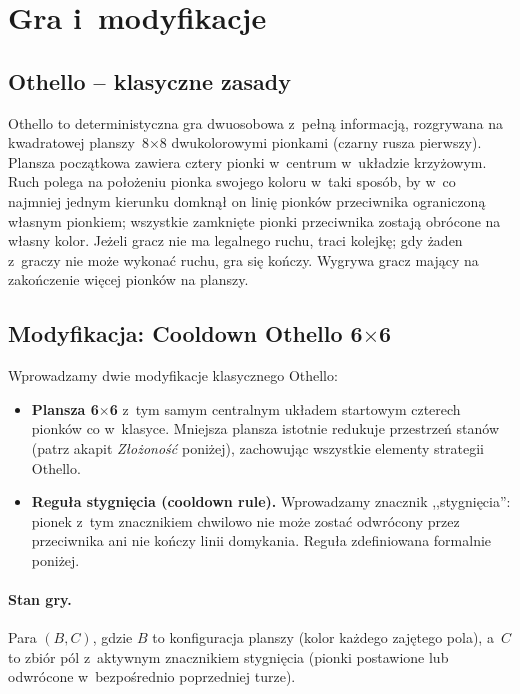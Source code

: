 \documentclass[11pt,a4paper]{article}
\begin{document}
\section{Gra i~modyfikacje}\label{sec:gra}

\subsection{Othello -- klasyczne zasady}

Othello to deterministyczna gra dwuosobowa z~pełną informacją, rozgrywana na kwadratowej planszy~8$\times$8 dwukolorowymi pionkami (czarny rusza pierwszy). Plansza początkowa zawiera cztery pionki w~centrum w~układzie krzyżowym. Ruch polega na położeniu pionka swojego koloru w~taki sposób, by w~co najmniej jednym kierunku domknął on linię pionków przeciwnika ograniczoną własnym pionkiem; wszystkie zamknięte pionki przeciwnika zostają obrócone na własny kolor. Jeżeli gracz nie ma legalnego ruchu, traci kolejkę; gdy żaden z~graczy nie może wykonać ruchu, gra się kończy. Wygrywa gracz mający na zakończenie więcej pionków na planszy.

\subsection{Modyfikacja: Cooldown Othello \texorpdfstring{6$\times$6}{6x6}}\label{sec:cooldown-rule}

Wprowadzamy dwie modyfikacje klasycznego Othello:
\begin{itemize}[leftmargin=1.5em,itemsep=2pt]
    \item \textbf{Plansza 6$\times$6} z~tym samym centralnym układem startowym czterech pionków co w~klasyce. Mniejsza plansza istotnie redukuje przestrzeń stanów (patrz akapit \emph{Złożoność} poniżej), zachowując wszystkie elementy strategii Othello.
    \item \textbf{Reguła stygnięcia (cooldown rule).} Wprowadzamy znacznik ,,stygnięcia'': pionek z~tym znacznikiem chwilowo nie może zostać odwrócony przez przeciwnika ani nie kończy linii domykania. Reguła zdefiniowana formalnie poniżej.
\end{itemize}

\paragraph{Stan gry.} Para $(B, C)$, gdzie $B$ to konfiguracja planszy (kolor każdego zajętego pola), a~$C$ to zbiór pól z~aktywnym znacznikiem stygnięcia (pionki postawione lub odwrócone w~bezpośrednio poprzedniej turze).
\end{document}
